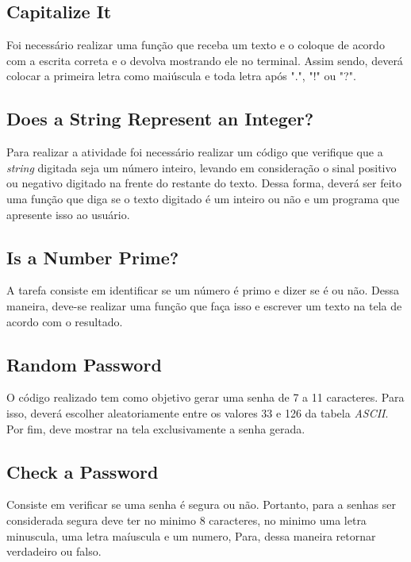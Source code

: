 \subsection{Capitalize It}

Foi necessário realizar uma função que receba um texto e o coloque de acordo com a escrita correta e o devolva mostrando ele no terminal. Assim sendo, deverá colocar a primeira letra como maiúscula e toda letra após ".", "!" ou "?". 

\subsection{Does a String Represent an Integer?}

Para realizar a atividade foi necessário realizar um código que verifique que a \textit{string} digitada seja um número inteiro, levando em consideração o sinal positivo ou negativo digitado na frente do restante do texto. Dessa forma, deverá ser feito uma função que diga se o texto digitado é um inteiro ou não e um programa que apresente isso ao usuário.

\subsection{Is a Number Prime?}

A tarefa consiste em identificar se um número é primo e dizer se é ou não. Dessa maneira, deve-se realizar uma função que faça isso e escrever um texto na tela de acordo com o resultado.

\subsection{Random Password}

O código realizado tem como objetivo gerar uma senha de 7 a 11 caracteres. Para isso, deverá escolher aleatoriamente entre os valores 33 e 126 da tabela \textit{ASCII}. Por fim, deve mostrar na tela exclusivamente a senha gerada.

\subsection{Check a Password}

Consiste em verificar se uma senha é segura ou não. Portanto, para a senhas ser considerada segura deve ter no minimo 8 caracteres, no minimo uma letra minuscula, uma letra maíuscula e um numero, Para, dessa maneira retornar verdadeiro ou falso.

